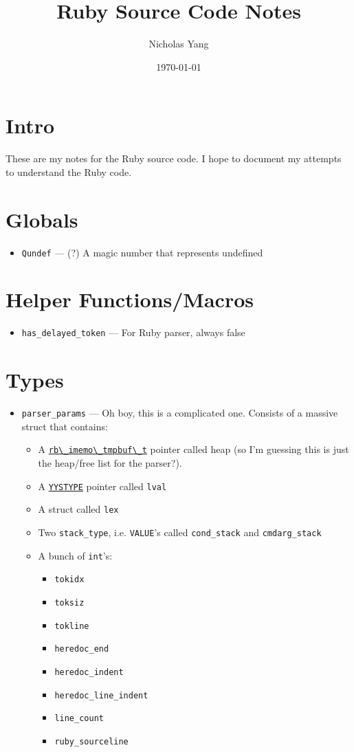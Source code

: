 \documentclass[11pt]{article}
\author{Nicholas Yang}
\date{\today}
\title{Ruby Source Code Notes}
\begin{document}
\maketitle
\tableofcontents


\section{Intro}
\label{sec-1}
These are my notes for the Ruby source code. I hope to document my
attempts to understand the Ruby code.

\section{Globals}
\label{sec-2}
\begin{itemize}
\item \label{Qundef} \verb~Qundef~ --- (?) A magic number that represents undefined
\end{itemize}

\section{Helper Functions/Macros}
\label{sec-3}
\begin{itemize}
\item \label{has_delayed_token} \verb~has_delayed_token~ --- For Ruby parser,
always false
\end{itemize}

\section{Types}
\label{sec-4}
\begin{itemize}
\item \label{parser_params} \verb~parser_params~ --- Oh boy, this is a complicated
one. Consists of a massive struct that contains:
\begin{itemize}
\item A \hyperref[rb_imemo_tmpbuf_t]{\verb~rb\_imemo\_tmpbuf\_t~} pointer called heap (so
I'm guessing this is just the heap/free list for the parser?).
\item A \hyperref[YYSTYPE]{\verb~YYSTYPE~} pointer called \verb~lval~
\item A struct called \texttt{\verb~lex~}
\item Two \verb~stack_type~, i.e. \texttt{\verb~VALUE~}'s called \verb~cond_stack~ and
\verb~cmdarg_stack~
\item A bunch of \verb~int~'s:
\begin{itemize}
\item \verb~tokidx~
\item \verb~toksiz~
\item \verb~tokline~
\item \verb~heredoc_end~
\item \verb~heredoc_indent~
\item \verb~heredoc_line_indent~
\item \verb~line_count~
\item \verb~ruby_sourceline~
\end{itemize}
\end{itemize}
\end{itemize}
\end{document}

